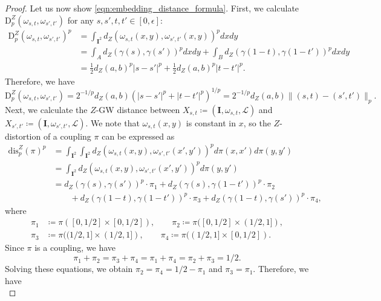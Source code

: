 \documentclass{article}
\theoremstyle{definition}
\newcommand{\dpz}{\mathrm{D}^Z_p}
\begin{document}
\begin{proof}
    Let us now show  \eqref{eqn:embedding_distance_formula}. First, we calculate $\dpz(\omega_{s, t}, \omega_{s', t'})$ for any $s, s', t, t' \in [0, \epsilon]$:
    \begin{align}
        \dpz(\omega_{s,t}, \omega_{s', t'})^p &= \int_{\mathbf{I}^2}d_Z(\omega_{s, t}(x, y), \omega_{s', t'}(x, y))^p dx dy \\
        &= \int_{A}d_Z(\gamma(s), \gamma(s'))^p dx dy + \int_{B}d_Z(\gamma(1-t), \gamma(1-t'))^p dx dy \\
        &= \frac{1}{2} d_Z(a,b)^p |s-s'|^p + \frac{1}{2} d_Z(a,b)^p |t-t'|^p.
    \end{align}
    Therefore, we have 
    \begin{equation}
        \dpz(\omega_{s,t}, \omega_{s', t'}) = 2^{-1/p}d_Z(a,b)\left(|s-s'|^p + |t-t'|^p\right)^{1/p} = 2^{-1/p}d_Z(a,b)\|(s,t) - (s', t')\|_p.
    \end{equation}
     Next, we calculate the $Z$-GW distance between $X_{s,t} \coloneqq (\mathbf{I}, \omega_{s,t}, \mathscr{L})$ and $X_{s', t'} \coloneqq (\mathbf{I}, \omega_{s', t'}, \mathscr{L})$. We note that $\omega_{s,t}(x,y)$ is constant in $x$, so the $Z$-distortion of a coupling $\pi$ can be expressed as 
    \begin{align}
        \mathrm{dis}_p^Z(\pi)^p &= \int_{\mathbf{I}^2}\int_{\mathbf{I}^2}d_Z(\omega_{s,t}(x, y), \omega_{s', t'}(x', y'))^p d\pi(x, x') d\pi (y,y') \\
        &= \int_{\mathbf{I}^2}d_Z(\omega_{s,t}(x, y), \omega_{s', t'}(x', y'))^p d\pi (y,y') \\
        &= d_Z(\gamma(s), \gamma(s'))^p\cdot \pi_1 + d_Z(\gamma(s), \gamma(1-t'))^p\cdot \pi_2 \\   & \qquad + d_Z(\gamma(1-t), \gamma(1-t'))^p\cdot \pi_3 + d_Z(\gamma(1-t), \gamma(s'))^p \cdot \pi_4,
    \end{align}
    where
    \begin{align*}
        \pi_1 &\coloneqq \pi([0,1/2]\times [0,1/2]), \qquad \pi_2 \coloneqq \pi([0,1/2]\times (1/2,1]), \\ 
        \pi_3 &\coloneqq \pi((1/2,1]\times (1/2,1]), \qquad \pi_4 \coloneqq \pi((1/2,1]\times [0,1/2]).
    \end{align*}
    Since $\pi$ is a coupling, we have 
    \[
    \pi_1 + \pi_2 = \pi_3 + \pi_4 = \pi_1 + \pi_4 = \pi_2 + \pi_3 = 1/2.
    \]
    Solving these equations, we obtain $\pi_2 = \pi_4 = 1/2 - \pi_1$ and $\pi_3 = \pi_1$. Therefore, we have 
    \begin{equation}\label{eqn:final_distortion_expression}

\end{equation}
\end{proof}
\end{document}
